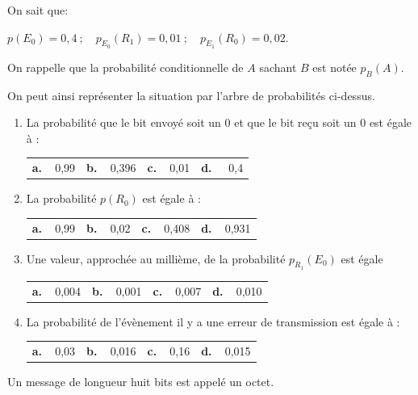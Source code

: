 \documentclass[10pt]{article}
\begin{document}
On sait que:

$p\left(E_0\right) = 0,4 \:;\quad p_{E_0}\left(R_1\right) = 0,01 \:;\quad p_{E_1}\left(R_0\right) = 0,02$.

On rappelle que la probabilité conditionnelle de $A$ sachant $B$ est notée $p_B(A)$.

On peut ainsi représenter la situation par l'arbre de probabilités ci-dessus.

\medskip

\begin{enumerate}
\item La probabilité que le bit envoyé soit un $0$ et que le bit reçu soit un $0$ est égale à :

\begin{center}
\begin{tabularx}{\linewidth}{*{4}{X}}
\textbf{a.~~}0,99 &\textbf{b.~~}0,396 &\textbf{c.~~}0,01 &\textbf{d.~~} 0,4
\end{tabularx}
\end{center}

\item La probabilité  $p\left(R_0\right)$ est égale à :
\begin{center}
\begin{tabularx}{\linewidth}{*{4}{X}}
\textbf{a.~~}0,99 &\textbf{b.~~}0,02 &\textbf{c.~~}0,408 &\textbf{d.~~}0,931
\end{tabularx}
\end{center}
\item Une valeur, approchée au millième, de la probabilité $p_{R_1}\left(E_0\right)$ est égale 
\begin{center}
\begin{tabularx}{\linewidth}{*{4}{X}}
\textbf{a.~~}0,004 &\textbf{b.~~}0,001 &\textbf{c.~~}0,007 &\textbf{d.~~}0,010
\end{tabularx}
\end{center}
\item La probabilité de l'évènement \og  il y a une erreur de transmission \fg{} est égale à :
\begin{center}
\begin{tabularx}{\linewidth}{*{4}{X}}
\textbf{a.~~}0,03 &\textbf{b.~~}0,016 &\textbf{c.~~}0,16 &\textbf{d.~~}0,015
\end{tabularx}
\end{center}
\end{enumerate}

Un message de longueur huit bits est appelé un octet.
\end{document}
